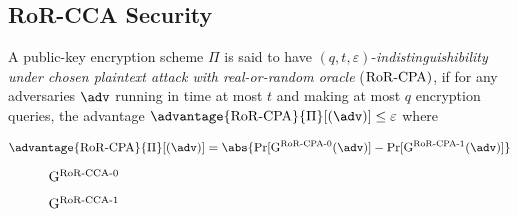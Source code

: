 \subsection{RoR-CCA Security}
A public-key encryption scheme  $\Pi$ is said to have $(q,t,\varepsilon)$-\textit{indistinguishibility under chosen plaintext attack with real-or-random oracle} ($\mathrm{RoR\textrm-CPA})$, if for any adversaries $\adv$ running in time at most $t$ and making at most $q$ encryption queries, the advantage $\advantage{\rorcpa}{\Pi}[(\adv)] \leq \varepsilon$ where 

$$
\advantage{\rorcpa}{\Pi}[(\adv)] = \abs{\Pr[\mathrm{G}^{\rorcpa\textrm-0}(\adv)]  - \Pr[\mathrm{G}^{\rorcpa\textrm-1}(\adv)]
} 
$$

\begin{figure}[!htp]
    \centering
    \begin{codeframe}[colback = white, width=5.25cm, height=9.5cm]{$\mathrm{G}^{\mathrm{RoR\textrm-CCA}\textrm-0}$}
        \begin{pcvstack}[space=0.3cm]
    
        \end{pcvstack}
    \end{codeframe}
    \hspace{0.5cm}
    \begin{codeframe}[colback = white, width=5.25cm, height=9.5cm]{$\mathrm{G}^{\mathrm{RoR\textrm-CCA}\textrm-1}$}
        \begin{pcvstack}[space=0.3cm]
            

\end{pcvstack}
\end{codeframe}
\end{figure}
